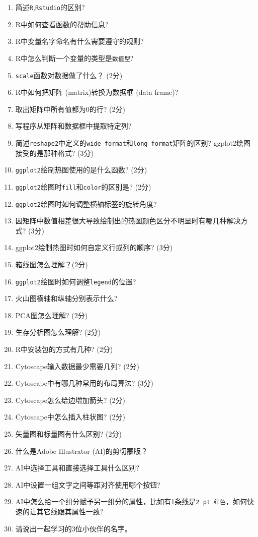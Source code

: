 \documentclass[]{article}
\numberwithin{figure}{section}
\numberwithin{table}{section}
\theoremstyle{definition}
\theoremstyle{definition}
\theoremstyle{definition}
\theoremstyle{remark}
\begin{document}
\begin{enumerate}
\def\labelenumi{\arabic{enumi}.}
\item
  简述\texttt{R},\texttt{Rstudio}的区别?
\item
  R中如何查看函数的帮助信息?
\item
  R中变量名字命名有什么需要遵守的规则?
\item
  R中怎么判断一个变量的类型是\texttt{数值型}?
\item
  \texttt{scale}函数对数据做了什么？ (2分)
\item
  R中如何把矩阵 (matrix)转换为数据框 (data frame)?
\item
  取出矩阵中所有值都为0的行? (2分)
\item
  写程序从矩阵和数据框中提取特定列?
\item
  简述\texttt{reshape2}中定义的\texttt{wide\ format}和\texttt{long\ format}矩阵的区别?
  ggplot2绘图接受的是那种格式? (3分)
\item
  \texttt{ggplot2}绘制热图使用的是什么函数? (2分)
\item
  \texttt{ggplot2}绘图时\texttt{fill}和\texttt{color}的区别是? (2分)
\item
  \texttt{ggplot2}绘图时如何调整横轴标签的旋转角度?
\item
  因矩阵中数值相差很大导致绘制出的热图颜色区分不明显时有哪几种解决方式?
  (3分)
\item
  ggplot2绘制热图时如何自定义行或列的顺序? (3分)
\item
  箱线图怎么理解？(2分)
\item
  \texttt{ggplot2}绘图时如何调整\texttt{legend}的位置?
\item
  火山图横轴和纵轴分别表示什么?
\item
  PCA图怎么理解? (2分)
\item
  生存分析图怎么理解? (2分)
\item
  R中安装包的方式有几种? (2分)
\item
  Cytoscape输入数据最少需要几列? (2分)
\item
  Cytoscape中有哪几种常用的布局算法? (3分)
\item
  Cytoscape怎么给边增加箭头? (2分)
\item
  Cytoscape中怎么插入柱状图? (2分)
\item
  矢量图和标量图有什么区别? (2分)
\item
  什么是Adobe Illustrator (AI)的剪切蒙版？
\item
  AI中选择工具和直接选择工具什么区别?
\item
  AI中设置一组文字之间等距对齐使用哪个按钮?
\item
  AI中怎么给一个组分赋予另一组分的属性，比如有1条线是\texttt{2\ pt\ 红色}，如何快速的让其它线跟其属性一致?
\item
  请说出一起学习的3位小伙伴的名字。
\end{enumerate}
\end{document}
